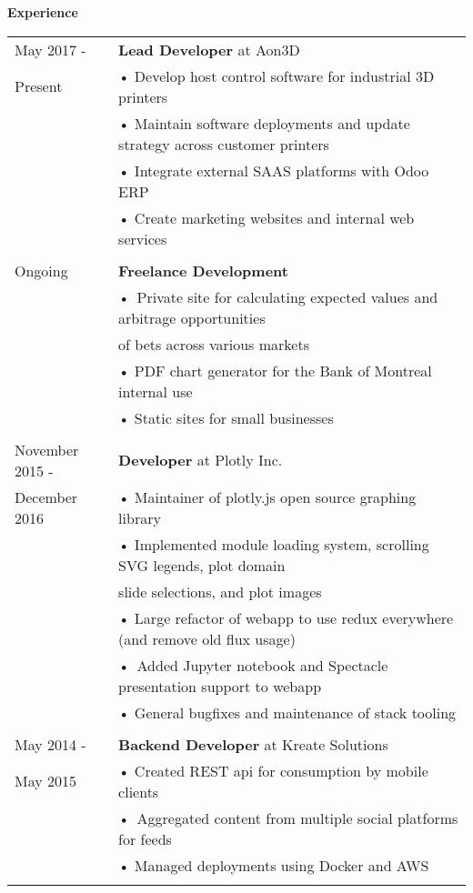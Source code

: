 \documentclass[10pt,notitlepage,oneside,draft]{article}
\begin{document}
\begin{flushleft}
  \large
  \textbf{Experience} \\
  \vspace{12pt}
  \normalsize
  \begin{tabular}{ p{86pt} | l}
    May 2017 - & \textbf{Lead Developer} at Aon3D \\
    Present & • Develop host control software for industrial 3D printers \\
    & • Maintain software deployments and update strategy across customer printers \\ 
    & • Integrate external SAAS platforms with Odoo ERP \\
    & • Create marketing websites and internal web services \\
    & \\ 
    Ongoing & \textbf{Freelance Development} \\
    & • Private site for calculating expected values and arbitrage opportunities \\
    & \hspace{5pt} of bets across various markets \\
    & • PDF chart generator for the Bank of Montreal internal use \\
    & • Static sites for small businesses \\
    & \\
    November 2015 - & \textbf{Developer} at Plotly Inc. \\
    December 2016 & • Maintainer of plotly.js open source graphing library \\
    & • Implemented module loading system, scrolling SVG legends, plot domain \\
    & \hspace{5pt} slide selections, and plot images \\
    & • Large refactor of webapp to use redux everywhere (and remove old flux usage) \\
    & • Added Jupyter notebook and Spectacle presentation support to webapp \\
    & • General bugfixes and maintenance of stack tooling \\
    & \\
    May 2014 - & \textbf{Backend Developer} at Kreate Solutions \\
    May 2015 & • Created REST api for consumption by mobile clients \\
    & • Aggregated content from multiple social platforms for feeds \\
    & • Managed deployments using Docker and AWS \\
    & \\
  \end{tabular}
  \vspace{20pt}



\end{flushleft}
\end{document}
